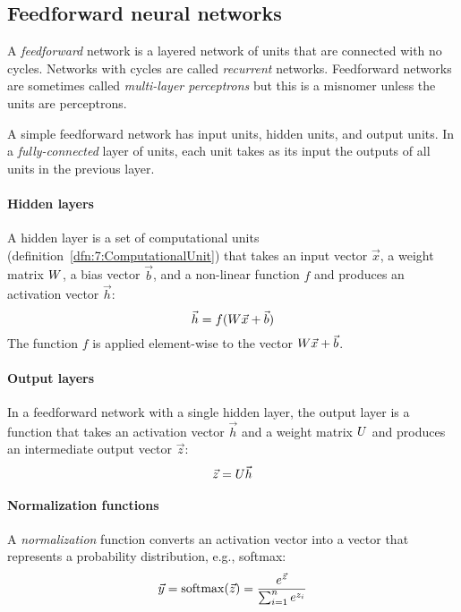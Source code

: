 \subsection{Feedforward neural networks}

A \textit{feedforward} network is a layered network of units that are connected
with no cycles.
Networks with cycles are called \textit{recurrent} networks.
Feedforward networks are sometimes called \textit{multi-layer perceptrons} but
this is a misnomer unless the units are perceptrons.

A simple feedforward network has input units, hidden units, and output units.
In a \textit{fully-connected} layer of units, each unit takes as its input the
outputs of all units in the previous layer.

\paragraph{Hidden layers}

A hidden layer is a set of computational units
(definition~\ref{dfn:7:ComputationalUnit}) that takes an input vector
$\vec{x}$, a weight matrix $W$, a bias vector $\vec{b}$, and a
non-linear function $f$ and produces an activation vector $\vec{h}$:
\begin{equation}
  \vec{h} = f(W \vec{x} + \vec{b})
\end{equation}
The function $f$ is applied element-wise to the vector $W \vec{x} +
  \vec{b}$.

\paragraph{Output layers}

In a feedforward network with a single hidden layer, the output layer is a
function that takes an activation vector $\vec{h}$ and a weight matrix
$U$ and produces an intermediate output vector $\vec{z}$:
\begin{equation}
  \vec{z} = U \vec{h}
\end{equation}

\paragraph{Normalization functions}

A \textit{normalization} function converts an activation vector into a vector
that represents a probability distribution, e.g., softmax:
\begin{equation}
  \vec{y} = \operatorname{softmax}(\vec{z}) = \frac{e^{\vec{z}}}{\sum_{i = 1}^{n} e^{z_i}}
\end{equation}

